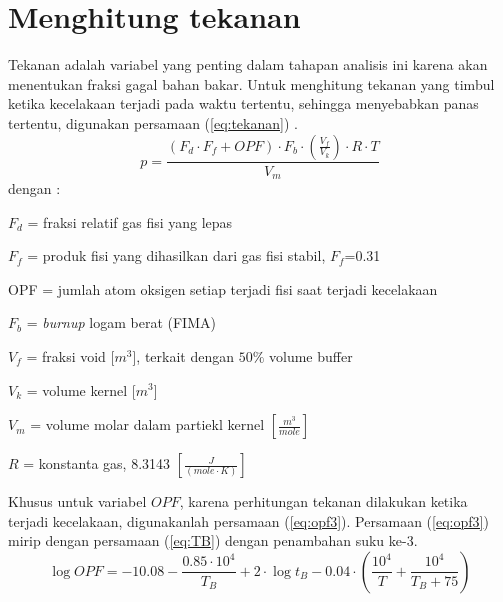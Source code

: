 \documentclass[a4paper,11pt]{report}
\begin{document}

\section{Menghitung tekanan}
Tekanan adalah variabel yang penting dalam tahapan analisis ini karena akan menentukan fraksi gagal bahan bakar. Untuk menghitung tekanan yang timbul ketika kecelakaan terjadi pada waktu tertentu, sehingga menyebabkan panas tertentu, digunakan persamaan (\ref{eq:tekanan}) \cite{wang2004integrated}. 
\begin{equation}
  p=\frac{(F_d \cdot F_f + OPF) \cdot F_b \cdot (\frac{V_f}{V_k}) \cdot R \cdot T}{ V_m}
  \label{eq:tekanan}
\end{equation}
dengan :
\begin{description}
  \item $F_d$ = fraksi relatif gas fisi yang lepas 
  \item $F_f$ = produk fisi yang dihasilkan dari gas fisi stabil, $F_f$=0.31
  \item OPF = jumlah atom oksigen setiap terjadi fisi saat terjadi kecelakaan
  \item $F_b$ = \textit{burnup} logam berat (FIMA)
  \item $V_f$ = fraksi void [$m^3$], terkait dengan $50\%$ volume buffer 
  \item $V_k$ = volume kernel [$m^3$]
  \item $V_m$ = volume molar dalam partiekl kernel $\left[\frac{m^3}{mole} \right]$
  \item $R$ = konstanta gas, 8.3143 $\left[\frac{J}{(mole \cdot K)} \right]$
\end{description}

Khusus untuk variabel $OPF$, karena perhitungan tekanan dilakukan ketika terjadi kecelakaan, digunakanlah persamaan (\ref{eq:opf3}). Persamaan (\ref{eq:opf3}) mirip dengan persamaan (\ref{eq:TB}) dengan penambahan suku ke-3.
\begin{equation}
  \log OPF=-10.08-\frac{0.85 \cdot 10^4}{T_B} + 2 \cdot \log t_B - 0.04 \cdot \left( \frac{10^4}{T} + \frac{10^4}{T_B + 75} \right)
  \label{eq:opf3}
\end{equation}
\end{document}
